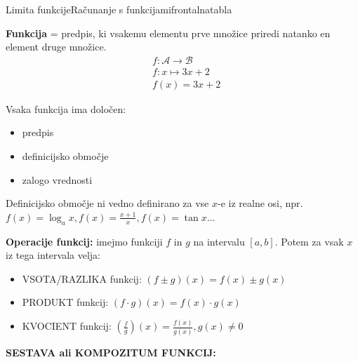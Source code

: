 \begin{priprava}{}{}{Limita funkcije}{Računanje s funkcijami}{frontalna}{tabla}


\textbf{Funkcija} = predpis, ki vsakemu elementu prve množice priredi natanko en element druge množice.
\begin{align*}
    & f: \mathcal A \longrightarrow \mathcal B \\
    & f: x \mapsto 3x + 2 \\
    & f(x) = 3x + 2
\end{align*}

Vsaka funkcija ima določen:
\begin{itemize}
    \item predpis
    \item definicijsko območje 
    \item zalogo vrednosti 
\end{itemize}

Definicijsko območje ni vedno definirano za vse $ x $-e iz realne osi, npr.  $ f(x) = \log_a x, f(x) = \frac{x + 1}{x}, f(x) = \tan x \ldots $


\textbf{Operacije funkcij:} imejmo funkciji $ f $ in $ g $ na intervalu $ [a, b] $. Potem za vsak $ x $ iz tega intervala velja:
\begin{itemize}
    \item VSOTA/RAZLIKA funkcij: $ (f \pm g)(x) = f(x) \pm g(x) $
    \item PRODUKT funkcij: $ (f \cdot g)(x) = f(x) \cdot g(x) $
    \item KVOCIENT funkcij: $ (\frac{f}{g})(x) = \frac{f(x)}{g(x)}, g(x) \neq 0 $
\end{itemize}


\textbf{SESTAVA ali KOMPOZITUM FUNKCIJ:}


\end{priprava}
